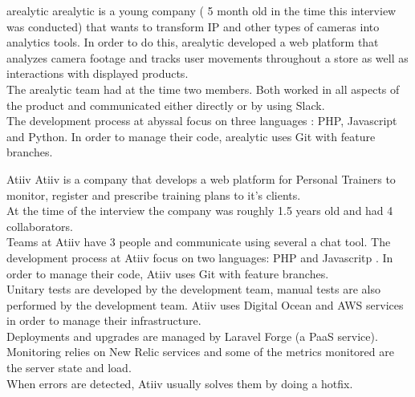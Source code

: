     \begin{companyreport}{arealytic}
      \product
      arealytic is a young company ( 5 month old in the time this interview was conducted) that wants to transform IP  and other types of cameras into analytics tools. In order to do this, arealytic developed a web platform that analyzes camera footage and tracks user movements throughout a store as well as interactions with displayed products.\\
      \teams
      The arealytic team had at the time two members. Both worked in all aspects of the product and communicated either directly or by using Slack.\\
      \development
      The development process at abyssal focus on three languages : PHP, Javascript and Python. In order to manage their code, arealytic uses Git with feature branches.\\
      \reportend
    \end{companyreport}

    \begin{companyreport}{Atiiv}
      \product
      Atiiv is a company that develops a web platform for Personal Trainers to monitor, register and prescribe training plans to it's clients.\\
      At the time of the interview the company was roughly 1.5 years old and had 4 collaborators.\\
      \teams
      Teams at Atiiv have 3 people and communicate  using several a chat tool.
      \development
      The development process at Atiiv focus on two languages: PHP and Javascritp . In order to manage their code, Atiiv uses Git  with feature branches. \\
      Unitary tests are developed by the development team, manual tests are also performed by the development team.
      \operations
      Atiiv uses Digital Ocean and AWS services in order to manage their infrastructure.  \\
      Deployments and upgrades are managed by Laravel Forge (a PaaS service). \\
      Monitoring relies on New Relic services and some of the metrics monitored are the server state and load. \\
      When errors are detected, Atiiv usually solves them by doing a hotfix.
      \reportend
    \end{companyreport}

